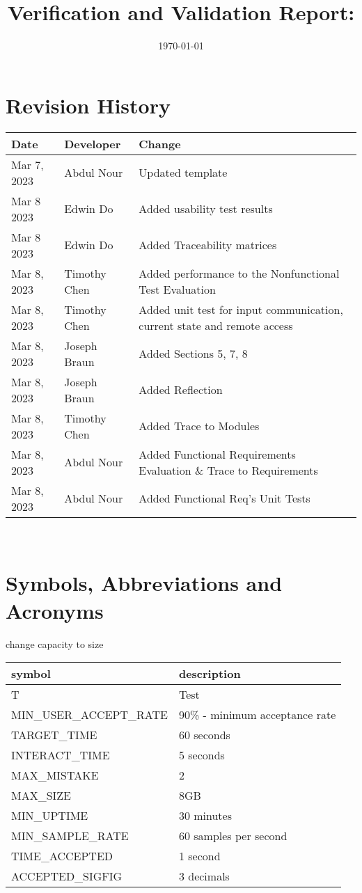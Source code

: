 \documentclass[12pt, titlepage]{article}
\begin{document}
\title{Verification and Validation Report: \progname} 
\author{\authname}
\date{\today}
	
\maketitle


\section{Revision History}


\begin{tabularx}{\textwidth}{p{3cm}p{3cm}X}
\toprule {\bf Date} & {\bf Developer} & {\bf Change}\\
\midrule
Mar 7, 2023 & Abdul Nour & Updated template\\
Mar 8 2023 & Edwin Do & Added usability test results \\
Mar 8 2023 & Edwin Do & Added Traceability matrices \\
Mar 8, 2023 & Timothy Chen & Added performance to the Nonfunctional Test Evaluation\\
Mar 8, 2023 & Timothy Chen & Added unit test for input communication, current state and remote access\\
Mar 8, 2023 & Joseph Braun & Added Sections 5, 7, 8 \\
Mar 8, 2023 & Joseph Braun & Added Reflection \\
Mar 8, 2023 & Timothy Chen & Added Trace to Modules \\
Mar 8, 2023 & Abdul Nour & Added Functional Requirements Evaluation \& Trace to Requirements\\
Mar 8, 2023 & Abdul Nour & Added Functional Req's Unit Tests\\
\bottomrule
\end{tabularx}

~\newpage

\section{Symbols, Abbreviations and Acronyms}
change capacity to size

\renewcommand{\arraystretch}{1.2}
\begin{tabular}{l l} 
  \toprule		
  \textbf{symbol} & \textbf{description}\\
  \midrule 
  T & Test\\
  MIN\_USER\_ACCEPT\_RATE & 90\% - minimum acceptance rate\\
  TARGET\_TIME & 60 seconds \\
  INTERACT\_TIME & 5 seconds \\
  MAX\_MISTAKE & 2 \\
  MAX\_SIZE & 8GB \\ 
  MIN\_UPTIME & 30 minutes \\ 
  MIN\_SAMPLE\_RATE & 60 samples per second\\
  TIME\_ACCEPTED & 1 second \\
  ACCEPTED\_SIGFIG & 3 decimals \\
  \bottomrule
\end{tabular}\\
\end{document}
